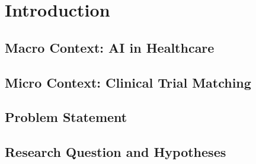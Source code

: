 
\chapter{Introduction}
\label{chap:introduction}

\section{Macro Context: AI in Healthcare}
\label{sec:intro-macro}


\section{Micro Context: Clinical Trial Matching}
\label{sec:intro-micro}


\section{Problem Statement}
\label{sec:intro-problem}


\section{Research Question and Hypotheses}
\label{sec:intro-question}

